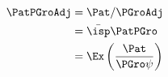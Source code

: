   \begin{equation}\begin{gathered}\begin{aligned}
    \PatPGroAdj  & = \Pat/\PGroAdj \label{eq;GPF}
    \\ & = \bar{\isp}\PatPGro  \notag %
    \\ & = \Ex\left(\frac{\Pat}{\PGro \psi}\right) \notag
  \end{aligned}\end{gathered}\end{equation}
